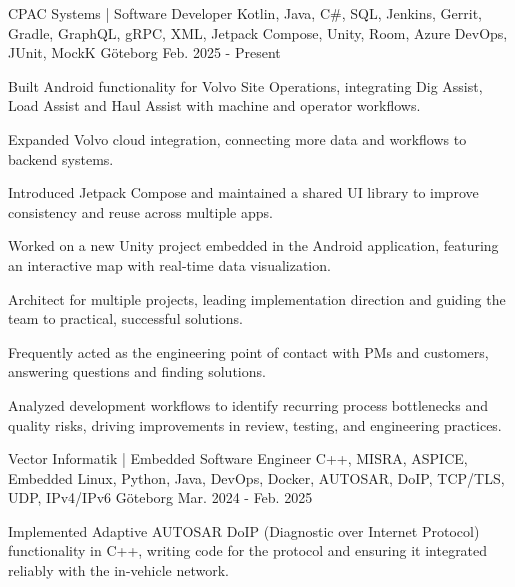 

\begin{cventries}

	\cventry
	{CPAC Systems | Software Developer} %
	{Kotlin, Java, C\#, SQL, Jenkins, Gerrit, Gradle, GraphQL, gRPC, XML, Jetpack Compose, Unity, Room, Azure DevOps, JUnit, MockK}
	{Göteborg} %
	{Feb. 2025 - Present} %
	{
		\begin{cvitems} %
			\item {Built Android functionality for Volvo Site Operations, integrating Dig Assist, Load Assist and Haul Assist with machine and operator workflows.}
			\item {Expanded Volvo cloud integration, connecting more data and workflows to backend systems.}
			\item {Introduced Jetpack Compose and maintained a shared UI library to improve consistency and reuse across multiple apps.}
			\item {Worked on a new Unity project embedded in the Android application, featuring an interactive map with real-time data visualization.}
			\item {Architect for multiple projects, leading implementation direction and guiding the team to practical, successful solutions.}
			\item {Frequently acted as the engineering point of contact with PMs and customers, answering questions and finding solutions.}
			\item {Analyzed development workflows to identify recurring process bottlenecks and quality risks, driving improvements in review, testing, and engineering practices.}
		\end{cvitems}
	}
	\cventry
	{Vector Informatik | Embedded Software Engineer} %
	{C++, MISRA, ASPICE, Embedded Linux, Python, Java, DevOps, Docker, AUTOSAR, DoIP, TCP/TLS, UDP, IPv4/IPv6} %
	{Göteborg} %
	{Mar. 2024 - Feb. 2025} %
	{
		\begin{cvitems} %
			\item {Implemented Adaptive AUTOSAR DoIP (Diagnostic over Internet Protocol) functionality in C++, writing code for the protocol and ensuring it integrated reliably with the in-vehicle network.}

\end{cvitems}}
\end{cventries}
